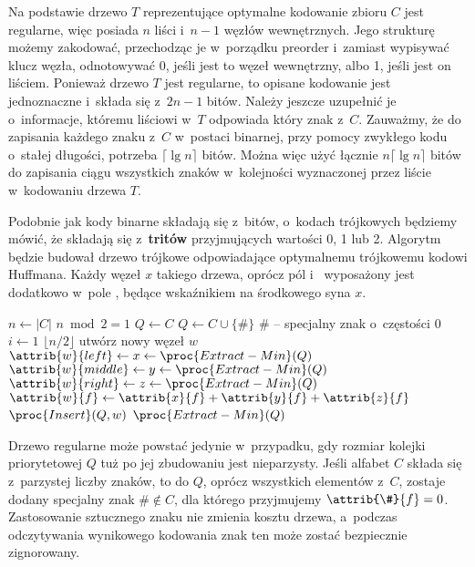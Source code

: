 \exercise %
Na podstawie  drzewo $T$ reprezentujące optymalne kodowanie zbioru $C$ jest regularne, więc posiada $n$ liści i~$n-1$ węzłów wewnętrznych.
Jego strukturę możemy zakodować, przechodząc je w~porządku preorder i~zamiast wypisywać klucz węzła, odnotowywać 0, jeśli jest to węzeł wewnętrzny, albo 1, jeśli jest on liściem.
Ponieważ drzewo $T$ jest regularne, to opisane kodowanie jest jednoznaczne i~składa się z~$2n-1$ bitów.
Należy jeszcze uzupełnić je o~informacje, któremu liściowi w~$T$ odpowiada który znak z~$C$.
Zauważmy, że do zapisania każdego znaku z~$C$ w~postaci binarnej, przy pomocy zwykłego kodu o~stałej długości, potrzeba $\lceil\lg n\rceil$ bitów.
Można więc użyć łącznie $n\lceil\lg n\rceil$ bitów do zapisania ciągu wszystkich znaków w~kolejności wyznaczonej przez liście w~kodowaniu drzewa $T$.

\exercise %
Podobnie jak kody binarne składają się z~bitów, o~kodach trójkowych będziemy mówić, że składają się z~\textbf{tritów} przyjmujących wartości 0, 1 lub 2.
Algorytm będzie budował drzewo trójkowe odpowiadające optymalnemu trójkowemu kodowi Huffmana.
Każdy węzeł $x$ takiego drzewa, oprócz pól  i~ wyposażony jest dodatkowo w~pole , będące wskaźnikiem na środkowego syna $x$.

\begin{codebox}
\li	$n\gets|C|$
\li	\If $n\bmod2=1$
\li		\Then $Q\gets C$
\li		\Else $Q\gets C\cup\{\#\}$ \>\>\>\>\Comment \# -- specjalny znak o~częstości 0
		\End
\li	\For $i\gets1$ \To $\lfloor n/2\rfloor$ \label{li:ternary-huffman-for-begin}
\li		\Do utwórz nowy węzeł $w$
\li			$\attrib{w}{left}\gets x\gets\proc{Extract-Min}(Q)$
\li			$\attrib{w}{middle}\gets y\gets\proc{Extract-Min}(Q)$
\li			$\attrib{w}{right}\gets z\gets\proc{Extract-Min}(Q)$
\li			$\attrib{w}{f}\gets\attrib{x}{f}+\attrib{y}{f}+\attrib{z}{f}$
\li			$\proc{Insert}(Q,w)$
		\End \label{li:ternary-huffman-for-end}
\li	\Return $\proc{Extract-Min}(Q)$
\end{codebox}
Drzewo regularne może powstać jedynie w~przypadku, gdy rozmiar kolejki priorytetowej $Q$ tuż po jej zbudowaniu jest nieparzysty.
Jeśli alfabet $C$ składa się z~parzystej liczby znaków, to do $Q$, oprócz wszystkich elementów z~$C$, zostaje dodany specjalny znak $\#\not\in C$, dla którego przyjmujemy $\attrib{\#}{f}=0$.
Zastosowanie sztucznego znaku nie zmienia kosztu drzewa, a~podczas odczytywania wynikowego kodowania znak ten może zostać bezpiecznie zignorowany.

